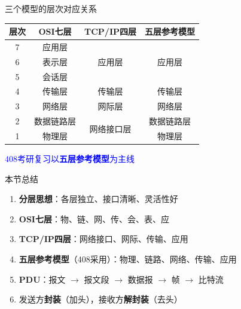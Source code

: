 \documentclass[10pt, aspectratio=169]{beamer}
\begin{document}
\begin{frame}{三个模型的层次对应关系}
    \begin{table}
        \begin{tabular}{|c|c|c|c|}
            \hline
            \textbf{层次} & \textbf{OSI七层} & \textbf{TCP/IP四层} & \textbf{五层参考模型} \\ \hline
            7 & 应用层 & \multirow{3}{*}{应用层} & \multirow{3}{*}{应用层} \\
            6 & 表示层 & & \\
            5 & 会话层 & & \\
            4 & 传输层 & 传输层 & 传输层 \\
            3 & 网络层 & 网际层 & 网络层 \\
            2 & 数据链路层 & \multirow{2}{*}{网络接口层} & 数据链路层 \\
            1 & 物理层 & & 物理层 \\
            \hline
        \end{tabular}
    \end{table}
    \vspace{0.5em}
    \begin{center}
        \textcolor{blue}{408考研复习以\textbf{五层参考模型}为主线}
    \end{center}
\end{frame}

\begin{frame}{本节总结}
    \begin{enumerate}
        \item \textbf{分层思想}：各层独立、接口清晰、灵活性好
        \item \textbf{OSI七层}：物、链、网、传、会、表、应
        \item \textbf{TCP/IP四层}：网络接口、网际、传输、应用
        \item \textbf{五层参考模型}（408采用）：物理、链路、网络、传输、应用
        \item \textbf{PDU}：报文 $\to$ 报文段 $\to$ 数据报 $\to$ 帧 $\to$ 比特流
        \item 发送方\textbf{封装}（加头），接收方\textbf{解封装}（去头）
    \end{enumerate}
\end{frame}
\end{document}
